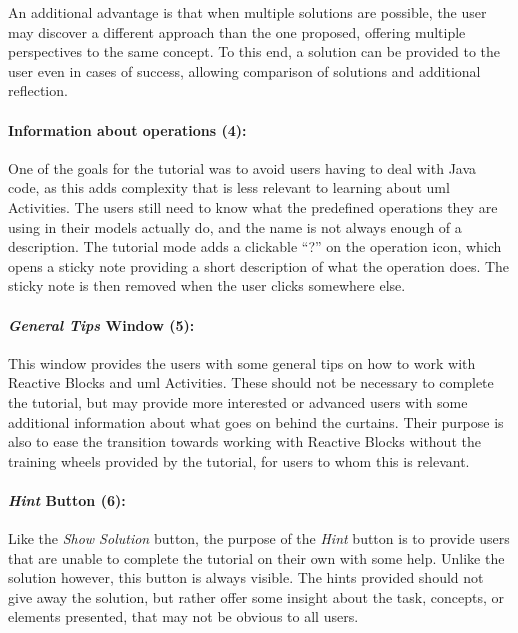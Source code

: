 \noindent
An additional advantage is that when multiple solutions are possible, the user may discover a different approach than the one proposed, offering multiple perspectives to the same concept. To this end, a solution can be provided to the user even in cases of success, allowing comparison of solutions and additional reflection.

\paragraph{Information about operations (4):} One of the goals for the tutorial was to avoid users having to deal with Java code, as this adds complexity that is less relevant to learning about \gls{uml} Activities. The users still need to know what the predefined operations they are using in their models actually do, and the name is not always enough of a description. The tutorial mode adds a clickable ``?'' on the operation icon, which opens a sticky note providing a short description of what the operation does. The sticky note is then removed when the user clicks somewhere else.

\paragraph{\emph{General Tips} Window (5):} This window provides the users with some general tips on how to work with Reactive Blocks and \gls{uml} Activities. These should not be necessary to complete the tutorial, but may provide more interested or advanced users with some additional information about what goes on behind the curtains. Their purpose is also to ease the transition towards working with Reactive Blocks without the training wheels provided by the tutorial, for users to whom this is relevant.

\paragraph{\emph{Hint} Button (6):} Like the \emph{Show Solution}
button, the purpose of the \emph{Hint} button is to provide users that are unable to complete the tutorial on their own with some help. Unlike the solution however, this button is always visible. The hints provided should not give away the solution, but rather offer some insight about the task, concepts, or elements presented, that may not be obvious to all users.

